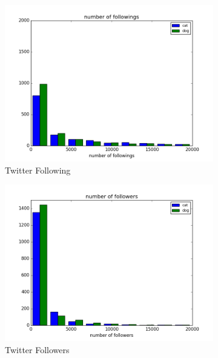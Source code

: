 \documentclass[12pt]{article}
\begin{document}
\begin{figure}[h!]
  \centering
  \begin{subfigure}[b]{0.3\linewidth}
    \includegraphics[width=\linewidth]{../MovieFollowInformation/twitterfollowing.png}
    \caption{Twitter Following}
  \end{subfigure}
  \begin{subfigure}[b]{0.3\linewidth}
    \includegraphics[width=\linewidth]{../MovieFollowInformation/twitterFollower.png}
    \caption{Twitter Followers}
  \end{subfigure}
  \begin{subfigure}[b]{0.3\linewidth}

\end{subfigure}
\end{figure}
\end{document}
